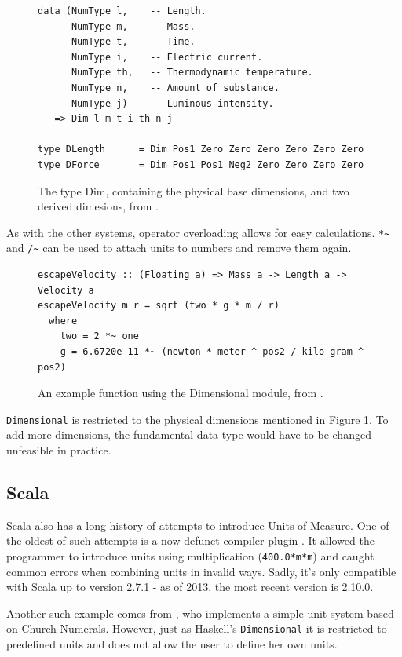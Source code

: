 \documentclass[12pt,oneside,a4paper]{scrbook}
\begin{document}
\begin{figure}
\begin{verbatim}
data (NumType l,    -- Length.
      NumType m,    -- Mass.
      NumType t,    -- Time.
      NumType i,    -- Electric current.
      NumType th,   -- Thermodynamic temperature.
      NumType n,    -- Amount of substance.
      NumType j)    -- Luminous intensity.
   => Dim l m t i th n j

type DLength      = Dim Pos1 Zero Zero Zero Zero Zero Zero
type DForce       = Dim Pos1 Pos1 Neg2 Zero Zero Zero Zero
\end{verbatim}
\caption{The type Dim, containing the physical base dimensions, and two derived dimesions, from \citep{Buckwalter06}.}
\label{code:haskell_dim}
\end{figure}


As with the other systems, operator overloading allows for easy calculations. \verb/*~/ and \verb|/~| can be used to attach units to numbers and remove them again.


\begin{figure}
\begin{verbatim}
escapeVelocity :: (Floating a) => Mass a -> Length a -> Velocity a
escapeVelocity m r = sqrt (two * g * m / r)
  where
    two = 2 *~ one
    g = 6.6720e-11 *~ (newton * meter ^ pos2 / kilo gram ^ pos2)
\end{verbatim}
\caption{An example function using the Dimensional module, from \citep{Buckwalter06}.}
\label{code:haskell_dimensional}
\end{figure}

\verb/Dimensional/ is restricted to the physical dimensions mentioned in Figure \ref{code:haskell_dim}. To add more dimensions, the fundamental data type would have to be changed - unfeasible in practice.


\subsection{Scala}

Scala also has a long history of attempts to introduce Units of Measure. One of the oldest of such attempts is a now defunct compiler plugin \citep{Nygard09}. It allowed the programmer to introduce units using multiplication (\verb/400.0*m*m/) and caught common errors when combining units in invalid ways. Sadly, it's only compatible with Scala up to version 2.7.1 - as of 2013, the most recent version is 2.10.0.

Another such example comes from \citep{McBeath08}, who implements a simple unit system based on Church Numerals. However, just as Haskell's \verb/Dimensional/ it is restricted to predefined units and does not allow the user to define her own units.
\end{document}
